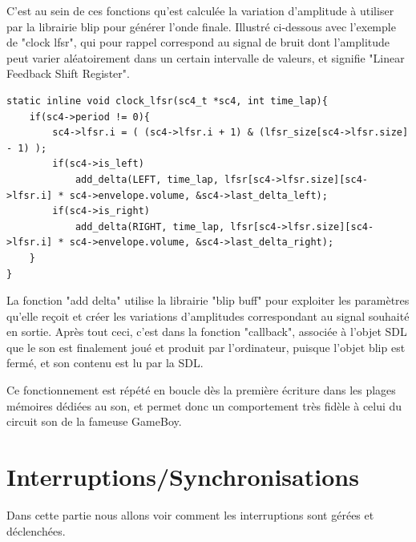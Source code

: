 \documentclass{report}
\begin{document}
C'est au sein de ces fonctions qu'est calculée la variation d'amplitude à utiliser par la librairie blip pour générer l'onde finale.
Illustré ci-dessous avec l'exemple de "clock lfsr", qui pour rappel correspond au signal de bruit dont l'amplitude peut varier aléatoirement dans 
un certain intervalle de valeurs, et signifie "Linear Feedback Shift Register".
\begin{lstlisting}
static inline void clock_lfsr(sc4_t *sc4, int time_lap){
	if(sc4->period != 0){
		sc4->lfsr.i = ( (sc4->lfsr.i + 1) & (lfsr_size[sc4->lfsr.size] - 1) );
		if(sc4->is_left)
			add_delta(LEFT, time_lap, lfsr[sc4->lfsr.size][sc4->lfsr.i] * sc4->envelope.volume, &sc4->last_delta_left);
		if(sc4->is_right)
			add_delta(RIGHT, time_lap, lfsr[sc4->lfsr.size][sc4->lfsr.i] * sc4->envelope.volume, &sc4->last_delta_right);
	}
}
\end{lstlisting}

La fonction "add delta" utilise la librairie "blip buff" pour exploiter les paramètres qu'elle reçoit et créer 
les variations d'amplitudes correspondant au signal souhaité en sortie.
Après tout ceci, c'est dans la fonction "callback", associée à l'objet SDL que le son est finalement joué et produit par l'ordinateur, puisque l'objet blip est fermé, et son contenu est lu par la SDL.

Ce fonctionnement est répété en boucle dès la première écriture dans les plages mémoires dédiées au son, et permet donc un comportement très fidèle à celui du circuit son de la fameuse GameBoy.
\section{Interruptions/Synchronisations}
Dans cette partie nous allons voir comment les interruptions sont gérées et déclenchées. 
\end{document}
